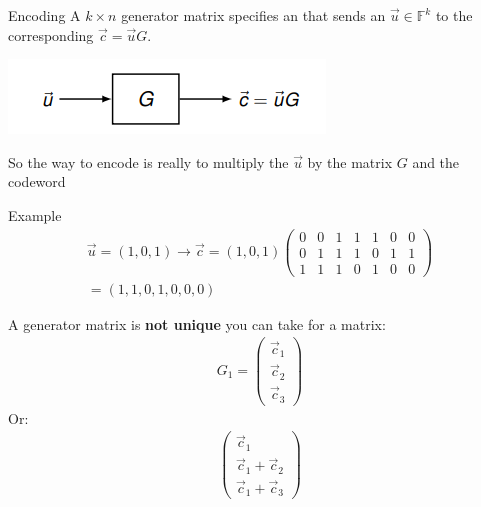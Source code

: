 \begin{parag}{Encoding}
    A $k \times n$ generator matrix specifies an  that sends an  $\vec{u} \in \mathbb{F}^k$ to the corresponding $\vec{c}= \vec{u}G$.
    \begin{center}
        \includegraphics[scale=1.1]{12025-05-13.png}
    \end{center}
    So the way to encode is really to multiply the $\vec{u}$ by the matrix $G$ and  the codeword
    \begin{subparag}{Example}
        \begin{align*} 
            \vec{u} =  \left(1, 0, 1\right) \to \vec{c} =  \left(1, 0, 1\right) \begin{pmatrix} 0 & 0 & 1 & 1 & 1 & 0 & 0 \\ 0 & 1 & 1 & 1 & 0 & 1 & 1 \\ 1 & 1 & 1 & 0 & 1 & 0 & 0 \end{pmatrix} \\
            = \left(1, 1, 0, 1, 0, 0, 0\right)
        \end{align*}
    \end{subparag}
    
    \begin{framedremark}
        A generator matrix is \textbf{not unique}  you can take for a matrix:
        \begin{align*} G_1 =  \begin{pmatrix} \vec{c}_1 \\ \vec{c}_2 \\ \vec{c}_3 \end{pmatrix}  \end{align*}
        Or:
        \begin{align*} \begin{pmatrix} \vec{c}_1 \\ \vec{c}_1 + \vec{c}_2 \\ \vec{c}_1 + \vec{c}_3 \end{pmatrix}  \end{align*}

    \end{framedremark}
\end{parag}
